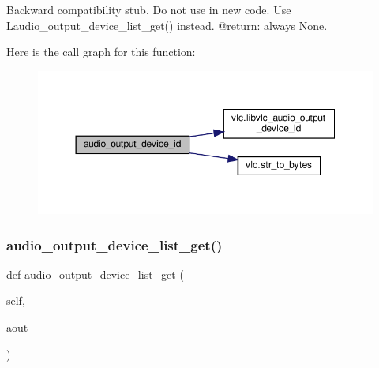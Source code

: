 \begin{DoxyVerb}Backward compatibility stub. Do not use in new code.
\deprecated Use L{audio_output_device_list_get}() instead.
@return: always None.
\end{DoxyVerb}
 Here is the call graph for this function\+:
\nopagebreak
\begin{figure}[H]
\begin{center}
\leavevmode
\includegraphics[width=350pt]{classvlc_1_1_instance_a42c03a29126ded661baf367276c59f5e_cgraph}
\end{center}
\end{figure}
\mbox{\label{classvlc_1_1_instance_ac5b57b31bfaf677dfd90ae3bc2c770e5}} 
\subsubsection{\texorpdfstring{audio\+\_\+output\+\_\+device\+\_\+list\+\_\+get()}{audio\_output\_device\_list\_get()}}
{\footnotesize\ttfamily def audio\+\_\+output\+\_\+device\+\_\+list\+\_\+get (\begin{DoxyParamCaption}\item[{}]{self,  }\item[{}]{aout }\end{DoxyParamCaption})}

